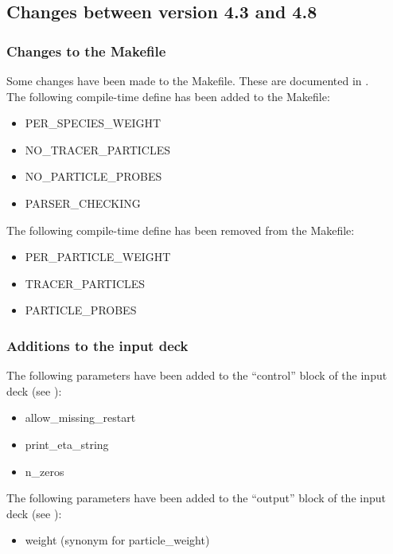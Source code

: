 \subsection{Changes between version 4.3 and 4.8}

\subsubsection{Changes to the Makefile}

Some changes have been made to the Makefile. These are documented in
.\\

\noindent The following compile-time define has been added to the Makefile:
\begin{itemize}
\item PER\_SPECIES\_WEIGHT
\item NO\_TRACER\_PARTICLES
\item NO\_PARTICLE\_PROBES
\item PARSER\_CHECKING
\end{itemize}
\bigskip

\noindent The following compile-time define has been removed from the Makefile:
\begin{itemize}
\item PER\_PARTICLE\_WEIGHT
\item TRACER\_PARTICLES
\item PARTICLE\_PROBES
\end{itemize}


\subsubsection{Additions to the input deck}
The following parameters have been added to the ``control'' block of
the input deck (see ):
\begin{itemize}
\item allow\_missing\_restart
\item print\_eta\_string
\item n\_zeros
\end{itemize}
\bigskip

\noindent The following parameters have been added to the ``output'' block of
the input deck (see ):
\begin{itemize}
\item weight (synonym for particle\_weight)
\end{itemize}
\bigskip

